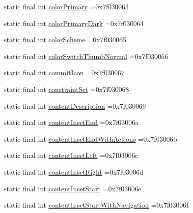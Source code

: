 \begin{DoxyCompactItemize}
\item 
static final int \mbox{\hyperlink{classbr_1_1unb_1_1cic_1_1mp_1_1marketmaster_1_1R_1_1attr_a4636d075cb013c7a73cb3a17e565aca3}{color\+Primary}} =0x7f030063
\item 
static final int \mbox{\hyperlink{classbr_1_1unb_1_1cic_1_1mp_1_1marketmaster_1_1R_1_1attr_a6d01a5bce7bfdb11d29fe8a72ef8d547}{color\+Primary\+Dark}} =0x7f030064
\item 
static final int \mbox{\hyperlink{classbr_1_1unb_1_1cic_1_1mp_1_1marketmaster_1_1R_1_1attr_a16c65c07db2f9be37edb8320e996aa06}{color\+Scheme}} =0x7f030065
\item 
static final int \mbox{\hyperlink{classbr_1_1unb_1_1cic_1_1mp_1_1marketmaster_1_1R_1_1attr_a21517336bca59b128d4132b05cebb6aa}{color\+Switch\+Thumb\+Normal}} =0x7f030066
\item 
static final int \mbox{\hyperlink{classbr_1_1unb_1_1cic_1_1mp_1_1marketmaster_1_1R_1_1attr_a5358b76c39e8c3942d4cc113ba4cba72}{commit\+Icon}} =0x7f030067
\item 
static final int \mbox{\hyperlink{classbr_1_1unb_1_1cic_1_1mp_1_1marketmaster_1_1R_1_1attr_a4a9a67464dd0ba2afb06e6c30612a41e}{constraint\+Set}} =0x7f030068
\item 
static final int \mbox{\hyperlink{classbr_1_1unb_1_1cic_1_1mp_1_1marketmaster_1_1R_1_1attr_a1d24db85179eb97584edca62b81f701f}{content\+Description}} =0x7f030069
\item 
static final int \mbox{\hyperlink{classbr_1_1unb_1_1cic_1_1mp_1_1marketmaster_1_1R_1_1attr_a62b3ce3305153983e9c4fe0a9afb7671}{content\+Inset\+End}} =0x7f03006a
\item 
static final int \mbox{\hyperlink{classbr_1_1unb_1_1cic_1_1mp_1_1marketmaster_1_1R_1_1attr_a50c42251e6f11861ef846cb5e4778fc1}{content\+Inset\+End\+With\+Actions}} =0x7f03006b
\item 
static final int \mbox{\hyperlink{classbr_1_1unb_1_1cic_1_1mp_1_1marketmaster_1_1R_1_1attr_a524c1513a6be339619184330fa2aad2c}{content\+Inset\+Left}} =0x7f03006c
\item 
static final int \mbox{\hyperlink{classbr_1_1unb_1_1cic_1_1mp_1_1marketmaster_1_1R_1_1attr_a275d313968d68e579c9b9092d10fed35}{content\+Inset\+Right}} =0x7f03006d
\item 
static final int \mbox{\hyperlink{classbr_1_1unb_1_1cic_1_1mp_1_1marketmaster_1_1R_1_1attr_a23bea47ff36c0deea9362a081f46f50b}{content\+Inset\+Start}} =0x7f03006e
\item 
static final int \mbox{\hyperlink{classbr_1_1unb_1_1cic_1_1mp_1_1marketmaster_1_1R_1_1attr_acd2fbc71444e1fe740afd7085955598b}{content\+Inset\+Start\+With\+Navigation}} =0x7f03006f

\end{DoxyCompactItemize}

